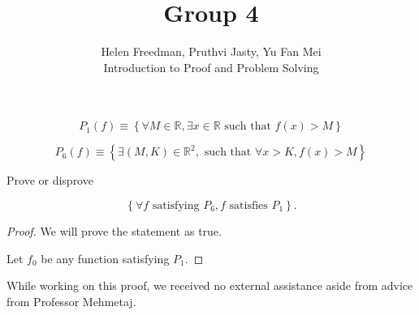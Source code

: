 \documentclass[12pt]{article}
\newenvironment{problem}[2][Problem]{\begin{trivlist}
\item[\hskip \labelsep {\bfseries #1}\hskip \labelsep {\bfseries #2.}]}{\end{trivlist}}
\begin{document}

\title{Group 4}%
\author{Helen Freedman, Pruthvi Jasty, Yu Fan Mei\\ %
	Introduction to Proof and Problem Solving} %
\maketitle

\begin{problem}{4a} %

    $$P_1 \left(f\right) \equiv \left\{ \forall M \in \mathbb{R}, \exists x \in \mathbb{R} \text{ such that } f(x) > M \right\}$$

    $$P_6 \left(f\right) \equiv \left\{ \exists (M, K) \in \mathbb{R}^2, \text{ such that } \forall x > K, f(x) > M \right\}$$

    Prove or disprove

    $$ \left\{ \forall f \text{ satisfying } P_6, f \text{ satisfies } P_1 \right\}. $$

\end{problem}

\begin{proof} We will prove the statement as true.

    Let $f_0$ be any function satisfying $P_1$. 



\end{proof}


\noindent While working on this proof, we received no external assistance aside from advice from Professor Mehmetaj.
\end{document}
